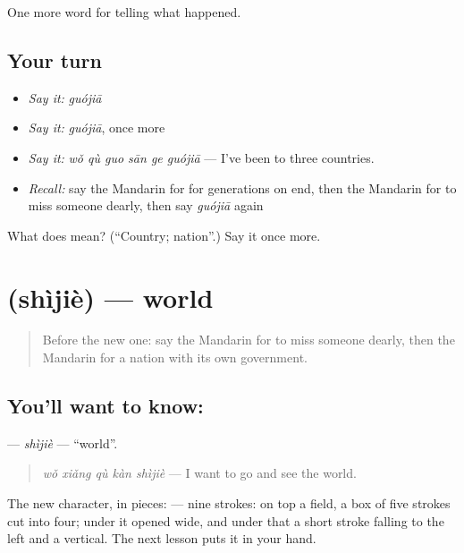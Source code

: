 \begin{grammarlens}[title={What you've built}]
One more word for telling what happened.
\end{grammarlens}

\subsection*{Your turn}
\begin{itemize}
\raggedright
  \item \emph{Say it:} \emph{guójiā}
  \item \emph{Say it:} \emph{guójiā}, once more
  \item \emph{Say it:} \emph{wǒ qù guo sān ge guójiā} — I've been to three countries.
  \item \emph{Recall:} say the Mandarin for for generations on end, then the Mandarin for to miss someone dearly, then say \emph{guójiā} again
\end{itemize}

\begin{tcolorbox}[breakable,colback=teal!4,colframe=teal!35!black,title={Before you move on}]
What does  mean? (\textquotedblleft{}Country; nation\textquotedblright{}.) Say it once more.
\end{tcolorbox}
\section[\texorpdfstring{\zh{世界} (shìjiè)}{世界 (shìjiè)}]{ (shìjiè) — world}

\label{lesson:ZH-C326-shijie}



\begin{quote}
Before the new one: say the Mandarin for to miss someone dearly, then the Mandarin for a nation with its own government.
\end{quote}

\subsection*{You'll want to know: }
\textbf{} — \emph{shìjiè} — \textquotedblleft{}world\textquotedblright{}.

\begin{quote}
\textbf{} \emph{wǒ xiǎng qù kàn shìjiè} — I want to go and see the world.
\end{quote}

The new character, in pieces:  — nine strokes: on top a field, a box of five strokes cut into four; under it  opened wide, and under that a short stroke falling to the left and a vertical. The next lesson puts it in your hand.

